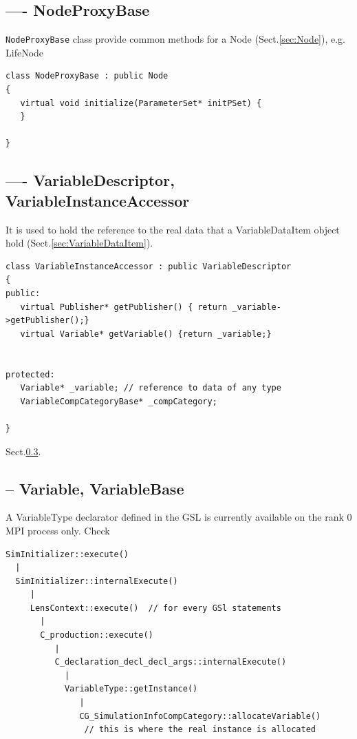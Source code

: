 \subsection{---- NodeProxyBase}
\label{sec:NodeProxyBase}

\verb!NodeProxyBase! class provide common methods for a Node
(Sect.\ref{sec:Node}), e.g. LifeNode

\begin{verbatim}
class NodeProxyBase : public Node
{
   virtual void initialize(ParameterSet* initPSet) {
   }
   
}
\end{verbatim}

\subsection{---- VariableDescriptor, VariableInstanceAccessor}
\label{sec:VariableDescriptor}
\label{sec:VariableInstanceAccessor}

It is used to hold the reference to the real data that a VariableDataItem object
hold (Sect.\ref{sec:VariableDataItem}).

\begin{verbatim}
class VariableInstanceAccessor : public VariableDescriptor
{
public:
   virtual Publisher* getPublisher() { return _variable->getPublisher();}
   virtual Variable* getVariable() {return _variable;}
 

protected:
   Variable* _variable; // reference to data of any type
   VariableCompCategoryBase* _compCategory;
   
}
\end{verbatim}
Sect.\ref{sec:Variable}.

\subsection{-- Variable, VariableBase}
\label{sec:Variable}
\label{sec:VariableBase}
\label{sec:VariableType}


A VariableType declarator defined in the GSL is currently available on the 
rank 0 MPI process only. Check
\begin{verbatim}
SimInitializer::execute()
  |
  SimInitializer::internalExecute()
     |
     LensContext::execute()  // for every GSl statements
       | 
       C_production::execute()
          |
          C_declaration_decl_decl_args::internalExecute()
            |
            VariableType::getInstance()  
               |
               CG_SimulationInfoCompCategory::allocateVariable()
                // this is where the real instance is allocated
               
\end{verbatim}

